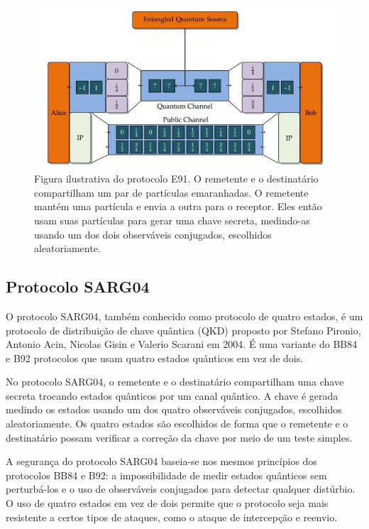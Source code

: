 \begin{figure}[!hbt]
  \centering
  \includegraphics[width=\textwidth]{images/e91.jpg}
  \caption{Figura ilustrativa do protocolo E91. O remetente e o destinatário compartilham um par de partículas emaranhadas. O remetente mantém uma partícula e envia a outra para o receptor. Eles então usam suas partículas para gerar uma chave secreta, medindo-as usando um dos dois observáveis conjugados, escolhidos aleatoriamente.}
  \label{fig:e91}
\end{figure}
\FloatBarrier

\subsection{Protocolo SARG04}

O protocolo SARG04, também conhecido como protocolo de quatro estados, é um protocolo de distribuição de chave quântica (QKD) proposto por Stefano Pironio, Antonio Acin, Nicolas Gisin e Valerio Scarani em 2004. É uma variante do BB84 e B92 protocolos que usam quatro estados quânticos em vez de dois.

No protocolo SARG04, o remetente e o destinatário compartilham uma chave secreta trocando estados quânticos por um canal quântico. A chave é gerada medindo os estados usando um dos quatro observáveis conjugados, escolhidos aleatoriamente. Os quatro estados são escolhidos de forma que o remetente e o destinatário possam verificar a correção da chave por meio de um teste simples.

A segurança do protocolo SARG04 baseia-se nos mesmos princípios dos protocolos BB84 e B92: a impossibilidade de medir estados quânticos sem perturbá-los e o uso de observáveis conjugados para detectar qualquer distúrbio. O uso de quatro estados em vez de dois permite que o protocolo seja mais resistente a certos tipos de ataques, como o ataque de intercepção e reenvio.

